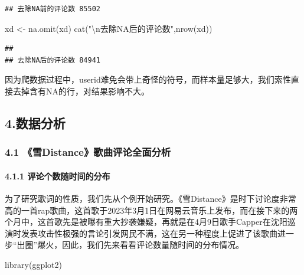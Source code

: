 \documentclass[
]{article}
\newenvironment{Shaded}{\begin{snugshade}}{\end{snugshade}}
\newcommand{\FunctionTok}[1]{\textcolor[rgb]{0.00,0.00,0.00}{#1}}
\newcommand{\NormalTok}[1]{#1}
\newcommand{\OtherTok}[1]{\textcolor[rgb]{0.56,0.35,0.01}{#1}}
\newcommand{\SpecialCharTok}[1]{\textcolor[rgb]{0.00,0.00,0.00}{#1}}
\newcommand{\StringTok}[1]{\textcolor[rgb]{0.31,0.60,0.02}{#1}}
\begin{document}
\begin{verbatim}
## 去除NA前的评论数 85502
\end{verbatim}

\begin{Shaded}
\begin{Highlighting}[]
\NormalTok{xd }\OtherTok{\textless{}{-}} \FunctionTok{na.omit}\NormalTok{(xd)}
\FunctionTok{cat}\NormalTok{(}\StringTok{"}\SpecialCharTok{\textbackslash{}n}\StringTok{去除NA后的评论数"}\NormalTok{,}\FunctionTok{nrow}\NormalTok{(xd))}
\end{Highlighting}
\end{Shaded}

\begin{verbatim}
## 
## 去除NA后的评论数 84941
\end{verbatim}

因为爬数据过程中，userid难免会带上奇怪的符号，而样本量足够大，我们索性直接去掉含有NA的行，对结果影响不大。

\hypertarget{ux6570ux636eux5206ux6790}{%
\subsection{4.数据分析}\label{ux6570ux636eux5206ux6790}}

\hypertarget{ux96eadistanceux6b4cux66f2ux8bc4ux8bbaux5168ux9762ux5206ux6790}{%
\subsubsection{4.1
《雪Distance》歌曲评论全面分析}\label{ux96eadistanceux6b4cux66f2ux8bc4ux8bbaux5168ux9762ux5206ux6790}}

\hypertarget{ux8bc4ux8bbaux4e2aux6570ux968fux65f6ux95f4ux7684ux5206ux5e03}{%
\paragraph{4.1.1
评论个数随时间的分布}\label{ux8bc4ux8bbaux4e2aux6570ux968fux65f6ux95f4ux7684ux5206ux5e03}}

为了研究歌词的性质，我们先从个例开始研究。《雪Distance》是时下讨论度非常高的一首rap歌曲，这首歌于2023年3月1日在网易云音乐上发布，而在接下来的两个月中，这首歌先是被曝有重大抄袭嫌疑，再就是在4月9日歌手Capper在沈阳巡演时发表攻击性极强的言论引发网民不满，这在另一种程度上促进了该歌曲进一步``出圈''爆火，因此，我们先来看看评论数量随时间的分布情况。

\begin{Shaded}
\begin{Highlighting}[]
\FunctionTok{library}\NormalTok{(ggplot2)}
\end{Highlighting}
\end{Shaded}
\end{document}
